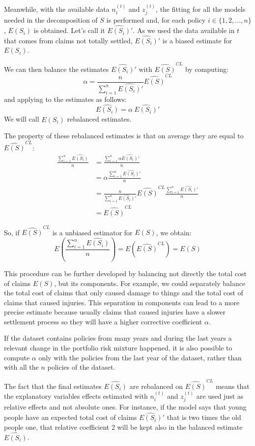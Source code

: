 \documentclass[a4paper, nobind]{templates/ociamthesis}
\theoremstyle{definition}
\theoremstyle{definition}
\theoremstyle{definition}
\theoremstyle{remark}
\begin{document}
Meanwhile, with the available data \(n_i^{(t)}\) and \(z_j^{(t)}\), the fitting for all the models needed in the decomposition of \(S\) is performed and, for each policy \(i\in\{1, 2, \dots, n\}\), \(E(S_i)\) is obtained. Let's call it \(\widehat{E(S_i)}'\). As we used the data available in \(t\) that comes from claims not totally settled, \(\widehat{E(S_i)}'\) is a biased estimate for \(E(S_i)\).

We can then balance the estimates \(\widehat{E(S_i)}'\) with \(\widehat{E(S)}^{CL}\) by computing:
\[
\alpha = \frac{n}{\sum_{i=1}^{n}{\widehat{E(S_i)}'}} \widehat{E(S)}^{CL}
\]
and applying to the estimates as follows:
\[
\widehat{E(S_i)} = \alpha \ \widehat{E(S_i)}'
\]
We will call \(\widehat{E(S_i)}\) rebalanced estimates.

The property of these rebalanced estimates is that on average they are equal to \(\widehat{E(S)}^{CL}\):
\begin{align*}
\frac{\sum_{i=1}^{n}{\widehat{E(S_i)}}}{n} & = \frac{\sum_{i=1}^{n}{\alpha\widehat{E(S_i)}'}}{n} \\
& = \alpha\frac{\sum_{i=1}^{n}{\widehat{E(S_i)}'}}{n} \\
& = \frac{n}{\sum_{i=1}^{n}{\widehat{E(S_i)}'}} \widehat{E(S)}^{CL} \frac{\sum_{i=1}^{n}{\widehat{E(S_i)}'}}{n} \\
& = \widehat{E(S)}^{CL}
\end{align*}

So, if \(\widehat{E(S)}^{CL}\) is a unbiased estimator for \(E(S)\), we obtain:
\[
E\left( \frac{\sum_{i=1}^{n}{\widehat{E(S_i)}}}{n} \right)
= E\left( \widehat{E(S)}^{CL} \right)
= E(S)
\]

This procedure can be further developed by balancing not directly the total cost of claims \(E(S)\), but its components. For example, we could separately balance the total cost of claims that only caused damage to things and the total cost of claims that caused injuries. This separation in components can lead to a more precise estimate because usually claims that caused injuries have a slower settlement process so they will have a higher corrective coefficient \(\alpha\).

If the dataset contains policies from many years and during the last years a relevant change in the portfolio risk mixture happened, it is also possible to compute \(\alpha\) only with the policies from the last year of the dataset, rather than with all the \(n\) policies of the dataset.

The fact that the final estimates \(\widehat{E(S_i)}\) are rebalanced on \(\widehat{E(S)}^{CL}\) means that the explanatory variables effects estimated with \(n_i^{(t)}\) and \(z_j^{(t)}\) are used just as relative effects and not absolute ones. For instance, if the model says that young people have an expected total cost of claims \(\widehat{E(S_i)}'\) that is two times the old people one, that relative coefficient 2 will be kept also in the balanced estimate \(\widehat{E(S_i)}\).
\end{document}
